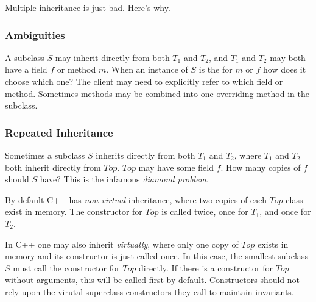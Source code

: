 \documentclass{article}
\begin{document}
Multiple inheritance is just bad. Here's why.

\subsubsection{Ambiguities}

A subclass $S$ may inherit directly from both $T_1$ and $T_2$, and $T_1$ and $T_2$ may both have a field $f$ or method $m$. When an instance of $S$ is the \receiver{} for $m$ or $f$ how does it choose which one? The client may need to explicitly refer to which field or method. Sometimes methods may be combined into one overriding method in the subclass.

\subsubsection{Repeated Inheritance}

Sometimes a subclass $S$ inherits directly from both $T_1$ and $T_2$, where $T_1$ and $T_2$ both inherit directly from $Top$. $Top$ may have some field $f$. How many copies of $f$ should $S$ have? This is the infamous \textit{diamond problem}.

By default C++ has \textit{non-virtual} inheritance, where two copies of each $Top$ class exist in memory. The constructor for $Top$ is called twice, once for $T_1$, and once for $T_2$.

In C++ one may also inherit \textit{virtually}, where only one copy of $Top$ exists in memory and its constructor is just called once.
In this case, the smallest subclass $S$ must call the constructor for $Top$ directly.
If there is a constructor for $Top$ without arguments, this will be called first by default. Constructors should not rely upon the virutal superclass constructors they call to maintain invariants.
\end{document}
